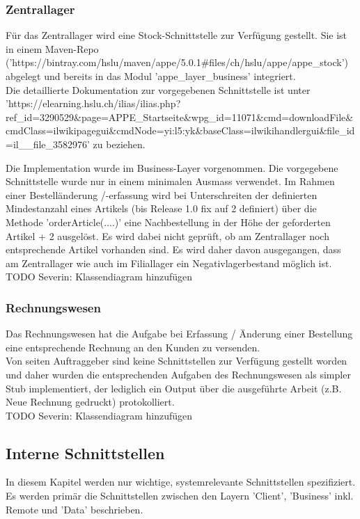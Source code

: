 \subsubsection{Zentrallager}
Für das Zentrallager wird eine Stock-Schnittstelle zur Verfügung gestellt. Sie ist in einem Maven-Repo ('https://bintray.com/hslu/maven/appe/5.0.1\#files/ch/hslu/appe/appe\_stock') abgelegt und bereits in das Modul 'appe\_layer\_business' integriert.\\
Die detaillierte Dokumentation zur vorgegebenen Schnittstelle ist unter\\
'https://elearning.hslu.ch/ilias/ilias.php?ref\_id=3290529\&page=APPE\_Startseite\&wpg\_id=11071\&cmd=downloadFile\&cmdClass=ilwikipagegui\&cmdNode=yi:l5:yk\&baseClass=ilwikihandlergui\&file\_id=il\_\_file\_3582976' zu beziehen.

Die Implementation wurde im Business-Layer vorgenommen. Die vorgegebene Schnittstelle wurde nur in einem minimalen Ausmass verwendet. Im Rahmen einer Bestelländerung /-erfassung wird bei Unterschreiten der definierten Mindestanzahl eines Artikels (bis Release 1.0 fix auf 2 definiert) über die Methode 'orderArticle(....)' eine Nachbestellung in der Höhe der geforderten Artikel + 2 ausgelöst. Es wird dabei nicht geprüft, ob am Zentrallager noch entsprechende Artikel vorhanden sind. Es wird daher davon ausgegangen, dass am Zentrallager wie auch im Filiallager ein Negativlagerbestand möglich ist.\\
TODO Severin: Klassendiagram hinzufügen
\subsubsection{Rechnungswesen}
Das Rechnungswesen hat die Aufgabe bei Erfassung / Änderung einer Bestellung eine entsprechende Rechnung an den Kunden zu versenden.\\
Von seiten Auftraggeber sind keine Schnittstellen zur Verfügung gestellt worden und daher wurden die entsprechenden Aufgaben des Rechnungswesen als simpler Stub implementiert, der lediglich ein Output über die ausgeführte Arbeit (z.B. Neue Rechnung gedruckt) protokolliert.\\
TODO Severin: Klassendiagram hinzufügen

\subsection{Interne Schnittstellen}
In diesem Kapitel werden nur wichtige, systemrelevante Schnittstellen spezifiziert. Es werden primär die Schnittstellen zwischen den Layern 'Client', 'Business' inkl. Remote und 'Data' beschrieben.


